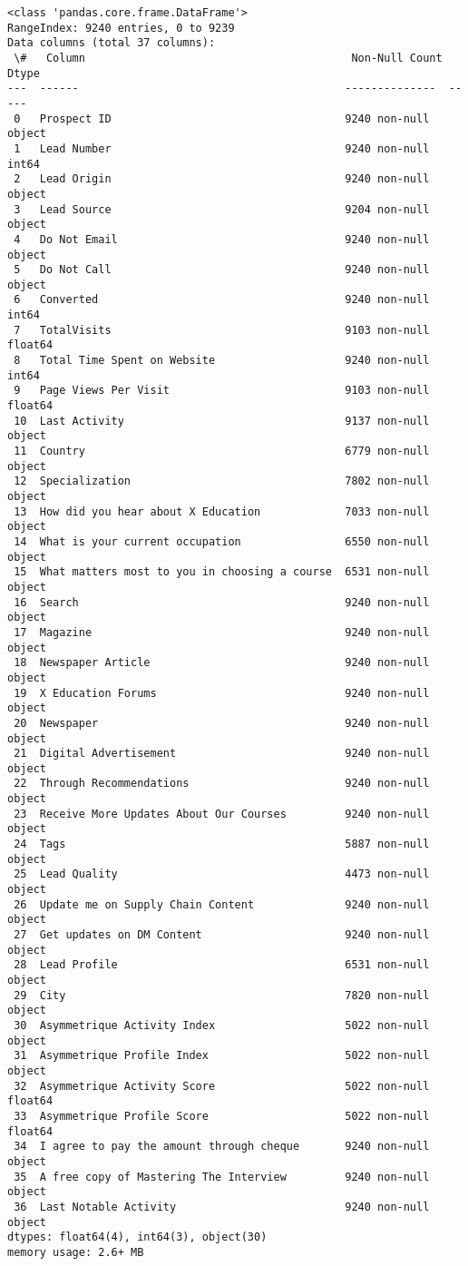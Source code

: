 \documentclass[11pt]{article}
\begin{document}
    \begin{Verbatim}[commandchars=\\\{\}]
<class 'pandas.core.frame.DataFrame'>
RangeIndex: 9240 entries, 0 to 9239
Data columns (total 37 columns):
 \#   Column                                         Non-Null Count  Dtype
---  ------                                         --------------  -----
 0   Prospect ID                                    9240 non-null   object
 1   Lead Number                                    9240 non-null   int64
 2   Lead Origin                                    9240 non-null   object
 3   Lead Source                                    9204 non-null   object
 4   Do Not Email                                   9240 non-null   object
 5   Do Not Call                                    9240 non-null   object
 6   Converted                                      9240 non-null   int64
 7   TotalVisits                                    9103 non-null   float64
 8   Total Time Spent on Website                    9240 non-null   int64
 9   Page Views Per Visit                           9103 non-null   float64
 10  Last Activity                                  9137 non-null   object
 11  Country                                        6779 non-null   object
 12  Specialization                                 7802 non-null   object
 13  How did you hear about X Education             7033 non-null   object
 14  What is your current occupation                6550 non-null   object
 15  What matters most to you in choosing a course  6531 non-null   object
 16  Search                                         9240 non-null   object
 17  Magazine                                       9240 non-null   object
 18  Newspaper Article                              9240 non-null   object
 19  X Education Forums                             9240 non-null   object
 20  Newspaper                                      9240 non-null   object
 21  Digital Advertisement                          9240 non-null   object
 22  Through Recommendations                        9240 non-null   object
 23  Receive More Updates About Our Courses         9240 non-null   object
 24  Tags                                           5887 non-null   object
 25  Lead Quality                                   4473 non-null   object
 26  Update me on Supply Chain Content              9240 non-null   object
 27  Get updates on DM Content                      9240 non-null   object
 28  Lead Profile                                   6531 non-null   object
 29  City                                           7820 non-null   object
 30  Asymmetrique Activity Index                    5022 non-null   object
 31  Asymmetrique Profile Index                     5022 non-null   object
 32  Asymmetrique Activity Score                    5022 non-null   float64
 33  Asymmetrique Profile Score                     5022 non-null   float64
 34  I agree to pay the amount through cheque       9240 non-null   object
 35  A free copy of Mastering The Interview         9240 non-null   object
 36  Last Notable Activity                          9240 non-null   object
dtypes: float64(4), int64(3), object(30)
memory usage: 2.6+ MB
    \end{Verbatim}
\end{document}
